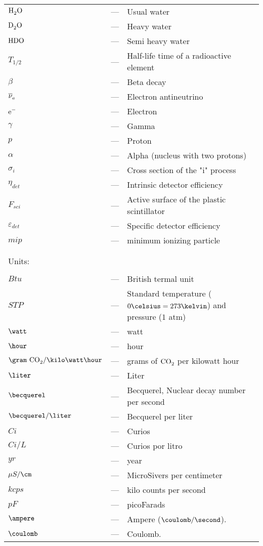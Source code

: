 \begin{longtable}{p{25mm} c p{120mm} }
$\ce{H_{2}O}$ & --- & Usual water\\
$\ce{D_{2}O}$ & --- & Heavy water\\
$\ce{HDO}$ & --- & Semi heavy water\\
$T_{1/2}$ & --- & Half-life time of a radioactive element\\
$\beta$ & --- & Beta decay\\
$\ce{\overline{\nu}_e}$ & --- & Electron antineutrino\\
$\ce{e^-}$ & --- & Electron\\
$\gamma$ & --- & Gamma\\
$p$ & --- & Proton\\
$\alpha$ & --- & Alpha (nucleus with two protons)\\
$\sigma_i$ & --- & Cross section of the "i" process\\
$\eta_{det}$ & --- & Intrinsic detector efficiency\\
$F_{sci}$ & --- & Active surface of the plastic scintillator\\
$\varepsilon_{det}$ & --- & Specific detector efficiency\\
$mip$ & --- & minimum ionizing particle\\

\\
\\

\multicolumn{3}{l}{Units:}\\
\\
$Btu$ & --- & British termal unit\\
$STP$ & --- & Standard temperature ($0\celsius=273\kelvin$) and pressure ($1$ atm)\\
$\watt$ & --- & watt\\
$\hour$ & --- & hour\\
$\gram~\ce{CO_2} /\kilo\watt\hour$ & --- & grams of $\ce{CO_2}$ per kilowatt hour\\
$\liter$ & --- & Liter\\
$\becquerel$ & --- & Becquerel, Nuclear decay number per second\\
$\becquerel/\liter$ & --- & Becquerel per liter\\
$Ci$ & --- & Curios\\
$Ci/L$ & --- & Curios por litro\\
$yr$ & --- & year\\
$\mu S/\cm$ & --- & MicroSivers per centimeter\\
$kcps$ & --- & kilo counts per second\\
$pF$ & --- & picoFarads\\
$\ampere$ & --- & Ampere ($\coulomb/\second$).\\
$\coulomb$ & --- & Coulomb.\\



\end{longtable}
